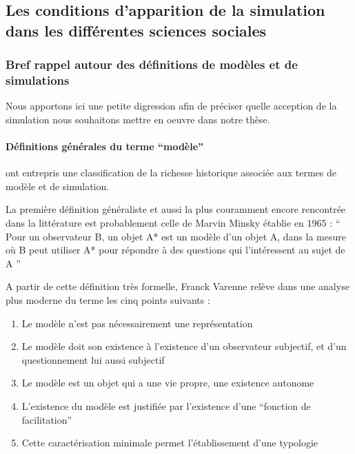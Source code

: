 \subsection{Les conditions d'apparition de la simulation dans les différentes sciences sociales }
\label{sec:apparition_simu_science_sociales}

\subsubsection{Bref rappel autour des définitions de modèles et de simulations}
\label{ssec:rapell_termes_generiques}

Nous apportons ici une petite digression afin de préciser quelle acception de la simulation nous souhaitons mettre en oeuvre dans notre thèse.

\paragraph{Définitions générales du terme \enquote{modèle}}

\textcite{Varenne2013} ont entrepris une classification de la richesse historique associée aux termes de modèle et de simulation.

La première définition généraliste et aussi la plus couramment encore rencontrée dans la littérature est probablement celle de Marvin Minsky établie en 1965 \autocite{Varenne2008} \autocite[15]{Varenne2013}  : \enquote{ Pour un observateur B, un objet A* est un modèle d’un objet A, dans la mesure où B peut utiliser A* pour répondre à des questions qui l’intéressent au sujet de A } \autocite{Minsky1965}

A partir de cette définition très formelle, Franck Varenne \autocite{Varenne2008} relève dans une analyse plus moderne du terme les cinq points suivants : 
\begin{enumerate}
  \item Le modèle n'est pas nécessairement une représentation
  \item Le modèle doit son existence à l'existence d'un observateur subjectif, et d'un questionnement lui aussi subjectif
  \item Le modèle est un objet qui a une vie propre, une existence autonome
  \item L'existence du modèle est justifiée par l'existence d'une \enquote{fonction de facilitation}
  \item Cette caractérisation minimale permet l'établissement d'une typologie
\end{enumerate}


